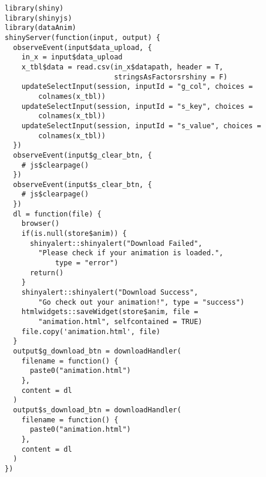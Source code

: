 \begin{lstlisting}
library(shiny)
library(shinyjs)
library(dataAnim)
shinyServer(function(input, output) {
  observeEvent(input$data_upload, {
    in_x = input$data_upload
    x_tbl$data = read.csv(in_x$datapath, header = T,
                          stringsAsFactorsrshiny = F)
    updateSelectInput(session, inputId = "g_col", choices = 
        colnames(x_tbl))
    updateSelectInput(session, inputId = "s_key", choices = 
        colnames(x_tbl))
    updateSelectInput(session, inputId = "s_value", choices = 
        colnames(x_tbl))
  })
  observeEvent(input$g_clear_btn, {
    # js$clearpage()
  })
  observeEvent(input$s_clear_btn, {
    # js$clearpage()
  })
  dl = function(file) {
    browser()
    if(is.null(store$anim)) {
      shinyalert::shinyalert("Download Failed", 
        "Please check if your animation is loaded.", 
            type = "error")
      return()
    }
    shinyalert::shinyalert("Download Success", 
        "Go check out your animation!", type = "success")
    htmlwidgets::saveWidget(store$anim, file = 
        "animation.html", selfcontained = TRUE)
    file.copy('animation.html', file)
  }
  output$g_download_btn = downloadHandler(
    filename = function() {
      paste0("animation.html")
    },
    content = dl
  )
  output$s_download_btn = downloadHandler(
    filename = function() {
      paste0("animation.html")
    },
    content = dl
  )
})

\end{lstlisting}